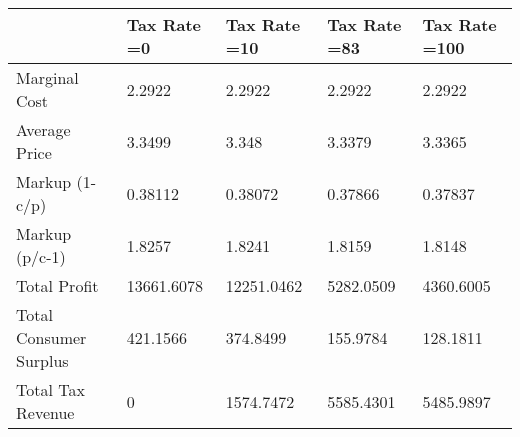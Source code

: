 \begin{tabular}{lllll}
& Tax Rate =0 & Tax Rate =10 & Tax Rate =83 & Tax Rate =100 \\ 
\hline 
Marginal Cost & 2.2922 & 2.2922 & 2.2922 & 2.2922 \\ 
Average Price & 3.3499 & 3.348 & 3.3379 & 3.3365 \\ 
Markup (1-c/p) & 0.38112 & 0.38072 & 0.37866 & 0.37837 \\ 
Markup (p/c-1) & 1.8257 & 1.8241 & 1.8159 & 1.8148 \\ 
Total Profit & 13661.6078 & 12251.0462 & 5282.0509 & 4360.6005 \\ 
Total Consumer Surplus & 421.1566 & 374.8499 & 155.9784 & 128.1811 \\ 
Total Tax Revenue & 0 & 1574.7472 & 5585.4301 & 5485.9897 \\ 
\hline 
\end{tabular}